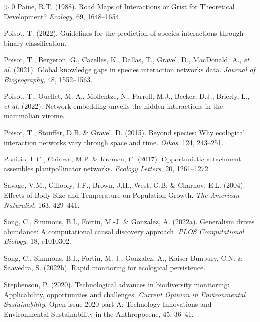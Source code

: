 \documentclass[10pt,oneside]{article}
\newlength{\cslhangindent}
\newenvironment{CSLReferences}[3] %
 {%
  \setlength{\parindent}{0pt}
  \ifodd #1 \everypar{\setlength{\hangindent}{\cslhangindent}}\ignorespaces\fi
  \ifnum #2 > 0
  \setlength{\parskip}{#2\baselineskip}
  \fi
 }%
 {}
\begin{document}
\begin{CSLReferences}{1}{0}
\leavevmode\hypertarget{ref-Paine1988RoaMap}{}%
Paine, R.T. (1988). Road Maps of Interactions or Grist for Theoretical
Development? \emph{Ecology}, 69, 1648--1654.

\leavevmode\hypertarget{ref-Poisot2022GuiPre}{}%
Poisot, T. (2022). Guidelines for the prediction of species interactions
through binary classification.

\leavevmode\hypertarget{ref-Poisot2021GloKno}{}%
Poisot, T., Bergeron, G., Cazelles, K., Dallas, T., Gravel, D.,
MacDonald, A., \emph{et al.} (2021). Global knowledge gaps in species
interaction networks data. \emph{Journal of Biogeography}, 48,
1552--1563.

\leavevmode\hypertarget{ref-Poisot2022NetEmb}{}%
Poisot, T., Ouellet, M.-A., Mollentze, N., Farrell, M.J., Becker, D.J.,
Brierly, L., \emph{et al.} (2022). Network embedding unveils the hidden
interactions in the mammalian virome.

\leavevmode\hypertarget{ref-Poisot2015SpeWhy}{}%
Poisot, T., Stouffer, D.B. \& Gravel, D. (2015). Beyond species: Why
ecological interaction networks vary through space and time.
\emph{Oikos}, 124, 243--251.

\leavevmode\hypertarget{ref-Ponisio2017OppAtt}{}%
Ponisio, L.C., Gaiarsa, M.P. \& Kremen, C. (2017). Opportunistic
attachment assembles plantpollinator networks. \emph{Ecology Letters},
20, 1261--1272.

\leavevmode\hypertarget{ref-Savage2004EffBod}{}%
Savage, V.M., Gillooly, J.F., Brown, J.H., West, G.B. \& Charnov, E.L.
(2004). Effects of Body Size and Temperature on Population Growth.
\emph{The American Naturalist}, 163, 429--441.

\leavevmode\hypertarget{ref-Song2022GenDri}{}%
Song, C., Simmons, B.I., Fortin, M.-J. \& Gonzalez, A. (2022a).
Generalism drives abundance: A computational causal discovery approach.
\emph{PLOS Computational Biology}, 18, e1010302.

\leavevmode\hypertarget{ref-Song2022RapMon}{}%
Song, C., Simmons, B.I., Fortin, M.-J., Gonzalez, A., Kaiser-Bunbury,
C.N. \& Saavedra, S. (2022b). Rapid monitoring for ecological
persistence.

\leavevmode\hypertarget{ref-Stephenson2020TecAdv}{}%
Stephenson, P. (2020). Technological advances in biodiversity
monitoring: Applicability, opportunities and challenges. \emph{Current
Opinion in Environmental Sustainability}, Open issue 2020 part A:
Technology Innovations and Environmental Sustainability in the
Anthropocene, 45, 36--41.


\end{CSLReferences}
\end{document}
